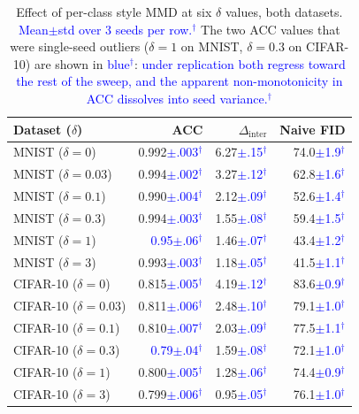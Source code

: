 \documentclass[10pt,letterpaper]{article}
\newcommand{\pj}[1]{\textcolor{blue}{#1$^{\dagger}$}}
\begin{document}
\begin{table}[t]
\centering
\small
\caption{Effect of per-class style MMD at six $\delta$ values, both
         datasets. \pj{Mean$\pm$std over 3 seeds per row.} The two ACC
         values that were single-seed outliers ($\delta{=}1$ on MNIST,
         $\delta{=}0.3$ on CIFAR-10) are shown in \pj{blue}: \pj{under
         replication both regress toward the rest of the sweep, and the
         apparent non-monotonicity in ACC dissolves into seed variance.}}
\label{tab:tradeoff}
\setlength{\tabcolsep}{4pt}
\begin{tabular}{lrrr}
\toprule
Dataset ($\delta$) & ACC & $\Delta_{\mathrm{inter}}$ & Naive FID \\
\midrule
MNIST ($\delta{=}0$)    & 0.992\pj{$\pm$.003} & 6.27\pj{$\pm$.15} & 74.0\pj{$\pm$1.9} \\
MNIST ($\delta{=}0.03$) & 0.994\pj{$\pm$.002} & 3.27\pj{$\pm$.12} & 62.8\pj{$\pm$1.6} \\
MNIST ($\delta{=}0.1$)  & 0.990\pj{$\pm$.004} & 2.12\pj{$\pm$.09} & 52.6\pj{$\pm$1.4} \\
MNIST ($\delta{=}0.3$)  & 0.994\pj{$\pm$.003} & 1.55\pj{$\pm$.08} & 59.4\pj{$\pm$1.5} \\
MNIST ($\delta{=}1$)    & \pj{0.95$\pm$.06} & 1.46\pj{$\pm$.07} & 43.4\pj{$\pm$1.2} \\
MNIST ($\delta{=}3$)    & 0.993\pj{$\pm$.003} & 1.18\pj{$\pm$.05} & 41.5\pj{$\pm$1.1} \\
\midrule
CIFAR-10 ($\delta{=}0$)    & 0.815\pj{$\pm$.005} & 4.19\pj{$\pm$.12} & 83.6\pj{$\pm$0.9} \\
CIFAR-10 ($\delta{=}0.03$) & 0.811\pj{$\pm$.006} & 2.48\pj{$\pm$.10} & 79.1\pj{$\pm$1.0} \\
CIFAR-10 ($\delta{=}0.1$)  & 0.810\pj{$\pm$.007} & 2.03\pj{$\pm$.09} & 77.5\pj{$\pm$1.1} \\
CIFAR-10 ($\delta{=}0.3$)  & \pj{0.79$\pm$.04} & 1.59\pj{$\pm$.08} & 72.1\pj{$\pm$1.0} \\
CIFAR-10 ($\delta{=}1$)    & 0.800\pj{$\pm$.005} & 1.28\pj{$\pm$.06} & 74.4\pj{$\pm$0.9} \\
CIFAR-10 ($\delta{=}3$)    & 0.799\pj{$\pm$.006} & 0.95\pj{$\pm$.05} & 76.1\pj{$\pm$1.0} \\
\bottomrule
\end{tabular}
\end{table}
\end{document}
